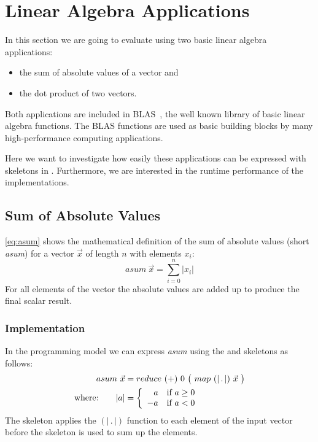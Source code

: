 \section{Linear Algebra Applications}
\label{section:skelcl:evaluation:linearAlgebra}

In this section we are going to evaluate \SkelCL using two basic linear algebra applications:
\begin{itemize}
  \item the sum of absolute values of a vector and
  \item the dot product of two vectors.
\end{itemize}

Both applications are included in BLAS~\cite{Dongarra2002,Dongarra2002a}, the well known library of basic linear algebra functions.
The BLAS functions are used as basic building blocks by many high-performance computing applications.

Here we want to investigate how easily these applications can be expressed with skeletons in \SkelCL.
Furthermore, we are interested in the runtime performance of the \SkelCL implementations.

\subsection*{Sum of Absolute Values}
\label{sec:asum}
\autoref{eq:asum} shows the mathematical definition of the sum of absolute values (short \emph{asum}) for a vector $\vec{x}$ of length $n$ with elements $x_i$:
\begin{equation}
  asum\ \vec{x} = \sum_{i=0}^{n} | x_i |
  \label{eq:asum}
\end{equation}
For all elements of the vector the absolute values are added up to produce the final scalar result.

\subsubsection*{\SkelCL Implementation}
In the \SkelCL programming model we can express \emph{asum} using the \map and \reduce skeletons as follows:
\begin{align}
  asum\ \vec{x} &= reduce\ (+)\ 0\ \big(\ map\ (|\, .\, |)\ \vec{x}\ \big)\label{eq:asum:skelcl}\\
  \text{where:} \qquad | a | &=
    \left\{
      \begin{array}{r l}
      a & \text{if } a \geq 0\\
      -a & \text{if } a < 0
      \end{array}
    \right.\nonumber
\end{align}
The \map skeleton applies the $(|\, .\, |)$ function to each element of the input vector before the \reduce skeleton is used to sum up the elements.


